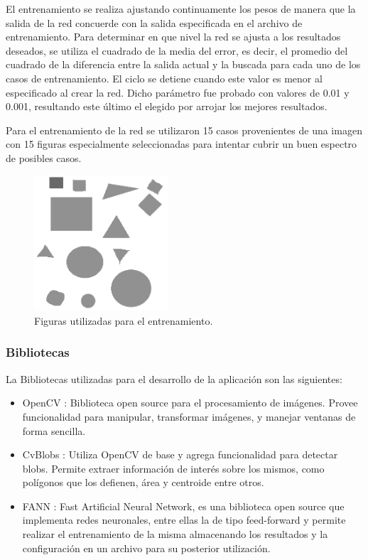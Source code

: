 \documentclass[pdftex,a4paper,10.5pt]{article}
\begin{document}
El entrenamiento se realiza ajustando continuamente los pesos de manera que 
la salida de la red  concuerde con la salida especificada en el archivo de entrenamiento. Para 
determinar en que nivel la red se ajusta a los resultados deseados, se utiliza el cuadrado de la media 
del error, es decir, el promedio del cuadrado de la diferencia entre la salida actual y la buscada para
cada uno de los casos de entrenamiento. El ciclo se detiene cuando este valor es menor al especificado
al crear la red. Dicho par\'ametro fue probado con valores de 0.01 y 0.001, resultando este \'ultimo el 
elegido por arrojar los mejores resultados.

Para el entrenamiento de la red se utilizaron 15 casos provenientes de una imagen con 15 figuras especialmente seleccionadas para intentar cubrir un buen espectro de posibles casos.
   
             \begin{figure}[H]
	                  \begin{center}
	                    \includegraphics[width=5cm]{prueba2.png}
	                    \caption{\label{entrenamiento} Figuras utilizadas para el entrenamiento. }
	                  \end{center}
	            \end{figure}




\subsubsection{Bibliotecas}
La Bibliotecas utilizadas para el desarrollo de la aplicaci\'on son las
siguientes:
\begin{itemize}
	\item	OpenCV \cite{openCV,openCVBook} : Biblioteca open source para el procesamiento de im\'agenes.
	Provee funcionalidad para manipular, transformar im\'agenes, y manejar ventanas de forma sencilla.
	\item	CvBlobs \cite{cvBlob}: Utiliza OpenCV de base y agrega funcionalidad para
	detectar blobs. Permite extraer informaci\'on de inter\'es sobre los mismos, como pol\'igonos que los 
	defienen, \'area y centroide entre otros.
	\item	FANN \cite{fann}: Fast Artificial Neural Network, es una biblioteca open source
	que implementa redes neuronales, entre ellas la de tipo feed-forward y permite realizar el entrenamiento      	de la misma almacenando los resultados y la configuraci\'on en un archivo para su posterior
	utilizaci\'on.
\end{itemize}
\end{document}
